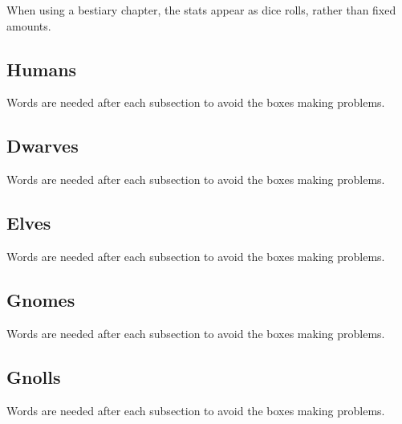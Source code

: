 \documentclass[a4paper,openany]{book}
\begin{document}
\begin{multicols}{2}


When using a bestiary chapter, the stats appear as dice rolls, rather than fixed amounts.

\subsection{Humans}
Words are needed after each subsection to avoid the boxes making problems.



\humanfarmer

\humansoldier

\sunguard

\humandiplomat

\doula

\humanbard

\humanthief

\humanalchemist

\humanalchemist

\necromancer

\subsection{Dwarves}
Words are needed after each subsection to avoid the boxes making problems.

\dwarvensoldier

\dwarventrader

\dwarvenrunemaster

\subsection{Elves}
Words are needed after each subsection to avoid the boxes making problems.



\elf

\elf


\hag

\subsection{Gnomes}
Words are needed after each subsection to avoid the boxes making problems.



\gnome

\gnomishillusionist

\subsection{Gnolls}
Words are needed after each subsection to avoid the boxes making problems.



\gnollhunter

\gnollshaman

\gnollshaman

\end{multicols}
\end{document}

